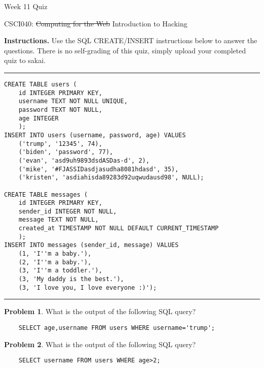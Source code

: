 \documentclass[10pt]{article}
\theoremstyle{definition}
\newtheorem{problem}{Problem}
\begin{document}
\begin{center}
    {
\Large
Week 11 Quiz
}

    \vspace{0.1in}
    CSCI040: \sout{Computing for the Web} Introduction to Hacking

    \vspace{0.1in}
\end{center}

\vspace{0.15in}
%
%

\noindent\textbf{Instructions.}
Use the SQL CREATE/INSERT instructions below to answer the questions.
There is no self-grading of this quiz,
simply upload your completed quiz to sakai.

\noindent
\rule{\textwidth}{1pt}
\begin{lstlisting}
CREATE TABLE users (
    id INTEGER PRIMARY KEY,
    username TEXT NOT NULL UNIQUE,
    password TEXT NOT NULL,
    age INTEGER
    );
INSERT INTO users (username, password, age) VALUES 
    ('trump', '12345', 74),
    ('biden', 'password', 77),
    ('evan', 'asd9uh9893dsdASDas-d', 2),
    ('mike', '#FJASSIDasdjasudha8081hdasd', 35),
    ('kristen', 'asdiahisda89283d92uqwudausd98', NULL);

CREATE TABLE messages (
    id INTEGER PRIMARY KEY,
    sender_id INTEGER NOT NULL,
    message TEXT NOT NULL,
    created_at TIMESTAMP NOT NULL DEFAULT CURRENT_TIMESTAMP
    );
INSERT INTO messages (sender_id, message) VALUES 
    (1, 'I''m a baby.'),
    (2, 'I''m a baby.'),
    (3, 'I''m a toddler.'),
    (3, 'My daddy is the best.'),
    (3, 'I love you, I love everyone :)');
\end{lstlisting}
\rule{\textwidth}{1pt}

\begin{problem}
    What is the output of the following SQL query?
    \begin{lstlisting}
    SELECT age,username FROM users WHERE username='trump';
    \end{lstlisting}
    \vspace{1in}
\end{problem}

\begin{problem}
    What is the output of the following SQL query?
    \begin{lstlisting}
    SELECT username FROM users WHERE age>2;
    \end{lstlisting}
    \vspace{1in}
\end{problem}
\end{document}
